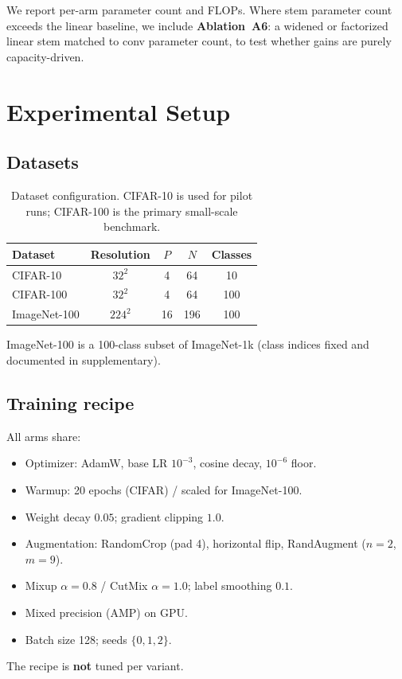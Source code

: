 \documentclass[10pt,twocolumn]{article}
\begin{document}
We report per-arm parameter count and FLOPs.
Where stem parameter count exceeds the linear baseline, we include \textbf{Ablation~A6}: a widened or factorized linear stem matched to conv parameter count, to test whether gains are purely capacity-driven.

\section{Experimental Setup}
\label{sec:setup}

\subsection{Datasets}

\begin{table}[t]
\centering
\caption{Dataset configuration. CIFAR-10 is used for pilot runs; CIFAR-100 is the primary small-scale benchmark.}
\label{tab:datasets}
\begin{tabular}{lcccc}
\toprule
Dataset & Resolution & $P$ & $N$ & Classes \\
\midrule
CIFAR-10   & $32^2$  & 4  & 64  & 10  \\
CIFAR-100  & $32^2$  & 4  & 64  & 100 \\
ImageNet-100 & $224^2$ & 16 & 196 & 100 \\
\bottomrule
\end{tabular}
\end{table}

ImageNet-100 is a 100-class subset of ImageNet-1k (class indices fixed and documented in supplementary).

\subsection{Training recipe}

All arms share:
\begin{itemize}
  \item Optimizer: AdamW, base LR $10^{-3}$, cosine decay, $10^{-6}$ floor.
  \item Warmup: 20 epochs (CIFAR) / scaled for ImageNet-100.
  \item Weight decay $0.05$; gradient clipping $1.0$.
  \item Augmentation: RandomCrop (pad 4), horizontal flip, RandAugment ($n{=}2$, $m{=}9$).
  \item Mixup $\alpha{=}0.8$ / CutMix $\alpha{=}1.0$; label smoothing $0.1$.
  \item Mixed precision (AMP) on GPU.
  \item Batch size 128; seeds $\{0,1,2\}$.
\end{itemize}
The recipe is \textbf{not} tuned per variant.
\end{document}
